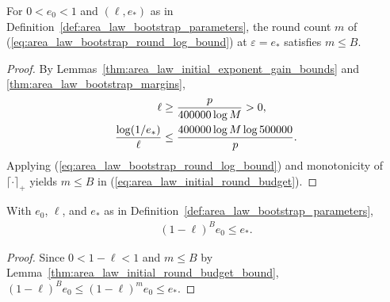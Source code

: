 \begin{lemma}
    \label{thm:area_law_initial_round_budget_bound}
    \leanok
    For $0<e_0<1$ and $(\ell,e_*)$ as in
    Definition~\ref{def:area_law_bootstrap_parameters}, the round count $m$ of
    (\ref{eq:area_law_bootstrap_round_log_bound}) at $\varepsilon=e_*$ satisfies
    $m\le B$.
\end{lemma}
\begin{proof}\leanok
    By Lemmas~\ref{thm:area_law_initial_exponent_gain_bounds} and
    \ref{thm:area_law_bootstrap_margins},
    \begin{align}
        \ell                     & \ge\frac{p}{400000\log M}>0,\notag         \\
        \frac{\log(1/e_*)}{\ell} & \le\frac{400000\log M\log500000}{p}.\notag
    \end{align}
    Applying (\ref{eq:area_law_bootstrap_round_log_bound}) and monotonicity of
    $\lceil\cdot\rceil_+$ yields $m\le B$ in (\ref{eq:area_law_initial_round_budget}).
\end{proof}

\begin{lemma}
    \label{thm:area_law_initial_round_budget_reaches}
    \leanok
    With $e_0$, $\ell$, and $e_*$ as in
    Definition~\ref{def:area_law_bootstrap_parameters},
    \begin{align}
        (1-\ell)^B e_0\le e_*.
        \label{eq:area_law_initial_round_budget_reaches}
    \end{align}
\end{lemma}
\begin{proof}\leanok
    Since $0<1-\ell<1$ and $m\le B$ by
    Lemma~\ref{thm:area_law_initial_round_budget_bound},
    $(1-\ell)^B e_0\le(1-\ell)^m e_0\le e_*$.
\end{proof}

